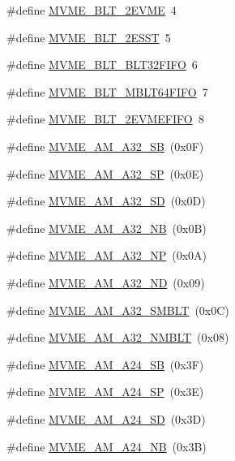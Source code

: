 \begin{DoxyCompactItemize}
\#define \hyperlink{group__mvmestdinclude_gac50f921d73b6b2e78540d734bed2cf05}{MVME\_\-BLT\_\-2EVME}~4
\item 
\#define \hyperlink{group__mvmestdinclude_gab2a0692732d5c4514218c4eeb9257567}{MVME\_\-BLT\_\-2ESST}~5
\item 
\#define \hyperlink{group__mvmestdinclude_ga8555fba49268cce0bc9daf90c3c052ff}{MVME\_\-BLT\_\-BLT32FIFO}~6
\item 
\#define \hyperlink{group__mvmestdinclude_gaab423ba16ad8c2f328862e7090cea712}{MVME\_\-BLT\_\-MBLT64FIFO}~7
\item 
\#define \hyperlink{group__mvmestdinclude_ga2b64419d5ad7dc206d4b4005368e6651}{MVME\_\-BLT\_\-2EVMEFIFO}~8
\item 
\#define \hyperlink{group__mvmestdinclude_ga8e19f6f8b7c77ba0700df4c8b4980163}{MVME\_\-AM\_\-A32\_\-SB}~(0x0F)
\item 
\#define \hyperlink{group__mvmestdinclude_gab1a3c7875d40430fa853e67739c78371}{MVME\_\-AM\_\-A32\_\-SP}~(0x0E)
\item 
\#define \hyperlink{group__mvmestdinclude_gac37a7339f5a193bdf0265f49aedb4696}{MVME\_\-AM\_\-A32\_\-SD}~(0x0D)
\item 
\#define \hyperlink{group__mvmestdinclude_ga89dedae70a7277e2091f7a7f66d28a01}{MVME\_\-AM\_\-A32\_\-NB}~(0x0B)
\item 
\#define \hyperlink{group__mvmestdinclude_ga2ad16250f1ba34f2990d8a88e62beb24}{MVME\_\-AM\_\-A32\_\-NP}~(0x0A)
\item 
\#define \hyperlink{group__mvmestdinclude_gafc80e688bd7646b4e6a52a49ab42d9b9}{MVME\_\-AM\_\-A32\_\-ND}~(0x09)
\item 
\#define \hyperlink{group__mvmestdinclude_gac536941f770602aece8422c1116dc1bd}{MVME\_\-AM\_\-A32\_\-SMBLT}~(0x0C)
\item 
\#define \hyperlink{group__mvmestdinclude_ga4a2020bb04f39a29cca6e3dc07615664}{MVME\_\-AM\_\-A32\_\-NMBLT}~(0x08)
\item 
\#define \hyperlink{group__mvmestdinclude_gafb3974875e67dd56677d8827da813aed}{MVME\_\-AM\_\-A24\_\-SB}~(0x3F)
\item 
\#define \hyperlink{group__mvmestdinclude_ga086f24604509da1e2cedd0593b3deaab}{MVME\_\-AM\_\-A24\_\-SP}~(0x3E)
\item 
\#define \hyperlink{group__mvmestdinclude_ga660f4364bb3473787e104621504a102b}{MVME\_\-AM\_\-A24\_\-SD}~(0x3D)
\item 
\#define \hyperlink{group__mvmestdinclude_ga7df6e64988001896058d216dc3e375a1}{MVME\_\-AM\_\-A24\_\-NB}~(0x3B)

\end{DoxyCompactItemize}
